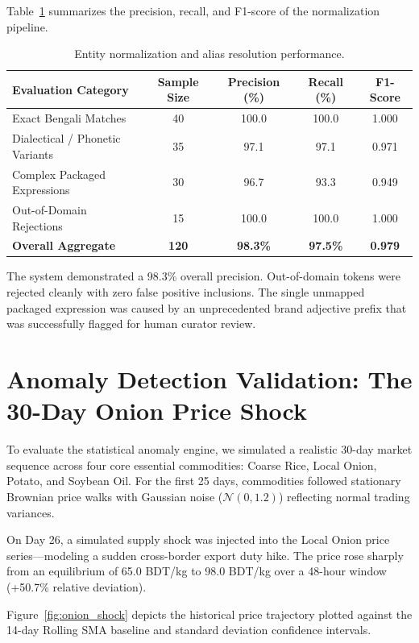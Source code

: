 Table~\ref{tab:normalization_results} summarizes the precision, recall, and F1-score of the normalization pipeline.

\begin{table}[htbp]
\centering
\caption{Entity normalization and alias resolution performance.}
\label{tab:normalization_results}
\begin{tabular}{@{}lcccc@{}}
\toprule
\textbf{Evaluation Category} & \textbf{Sample Size} & \textbf{Precision (\%)} & \textbf{Recall (\%)} & \textbf{F1-Score} \\
\midrule
Exact Bengali Matches & 40 & 100.0 & 100.0 & 1.000 \\
Dialectical / Phonetic Variants & 35 & 97.1 & 97.1 & 0.971 \\
Complex Packaged Expressions & 30 & 96.7 & 93.3 & 0.949 \\
Out-of-Domain Rejections & 15 & 100.0 & 100.0 & 1.000 \\
\midrule
\textbf{Overall Aggregate} & \textbf{120} & \textbf{98.3\%} & \textbf{97.5\%} & \textbf{0.979} \\
\bottomrule
\end{tabular}
\end{table}

The system demonstrated a 98.3\% overall precision. Out-of-domain tokens were rejected cleanly with zero false positive inclusions. The single unmapped packaged expression was caused by an unprecedented brand adjective prefix that was successfully flagged for human curator review.

\section{Anomaly Detection Validation: The 30-Day Onion Price Shock}
To evaluate the statistical anomaly engine, we simulated a realistic 30-day market sequence across four core essential commodities: Coarse Rice, Local Onion, Potato, and Soybean Oil. For the first 25 days, commodities followed stationary Brownian price walks with Gaussian noise ($\mathcal{N}(0, 1.2)$) reflecting normal trading variances.

On Day 26, a simulated supply shock was injected into the Local Onion price series—modeling a sudden cross-border export duty hike. The price rose sharply from an equilibrium of 65.0 BDT/kg to 98.0 BDT/kg over a 48-hour window (+50.7\% relative deviation).

Figure~\ref{fig:onion_shock} depicts the historical price trajectory plotted against the 14-day Rolling SMA baseline and standard deviation confidence intervals.

